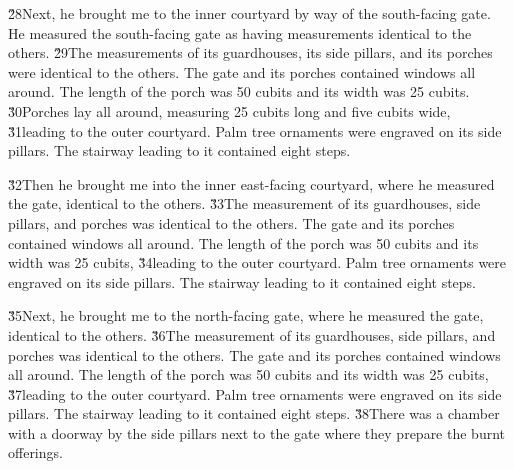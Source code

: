 \v{28}Next, he brought me to the inner courtyard by way of the south-facing gate. He measured the south-facing gate as having measurements identical to the others. \v{29}The measurements of its guardhouses, its side pillars, and its porches were identical to the others. The gate and its porches contained windows all around. The length of the porch was 50 cubits and its width was 25 cubits. \v{30}Porches lay all around, measuring 25 cubits long and five cubits wide, \v{31}leading to the outer courtyard. Palm tree ornaments were engraved on its side pillars. The stairway leading to it contained eight steps.

\v{32}Then he brought me into the inner east-facing courtyard, where he measured the gate, identical to the others. \v{33}The measurement of its guardhouses, side pillars, and porches was identical to the others. The gate and its porches contained windows all around. The length of the porch was 50 cubits and its width was 25 cubits, \v{34}leading to the outer courtyard. Palm tree ornaments were engraved on its side pillars. The stairway leading to it contained eight steps.

\v{35}Next, he brought me to the north-facing gate, where he measured the gate, identical to the others. \v{36}The measurement of its guardhouses, side pillars, and porches was identical to the others. The gate and its porches contained windows all around. The length of the porch was 50 cubits and its width was 25 cubits, \v{37}leading to the outer courtyard. Palm tree ornaments were engraved on its side pillars. The stairway leading to it contained eight steps. \v{38}There was a chamber with a doorway by the side pillars next to the gate where they prepare the burnt offerings.


